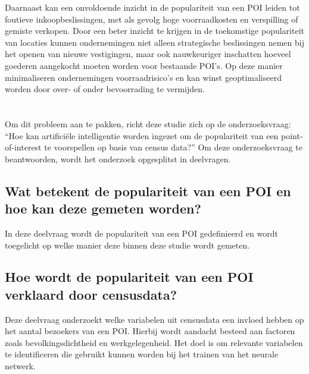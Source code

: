 Daarnaast kan een onvoldoende inzicht in de populariteit van een POI leiden tot foutieve inkoopbeslissingen, met als gevolg hoge voorraadkosten en verspilling of gemiste verkopen. Door een beter inzicht te krijgen in de toekomstige populariteit van locaties kunnen ondernemingen niet alleen strategische beslissingen nemen bij het openen van nieuwe vestigingen, maar ook nauwkeuriger inschatten hoeveel goederen aangekocht moeten worden voor bestaande POI’s. Op deze manier minimaliseren ondernemingen voorraadrisico’s en kan winst geoptimaliseerd worden door over- of onder bevoorrading te vermijden.


\section{}%
\label{sec:onderzoeksvraag}


Om dit probleem aan te pakken, richt deze studie zich op de onderzoeksvraag: “Hoe kan artificiële intelligentie worden ingezet om de populariteit van een point-of-interest te voorspellen op basis van census data?” Om deze onderzoeksvraag te beantwoorden, wordt het onderzoek opgesplitst in deelvragen.

\subsection{Wat betekent de populariteit van een POI en hoe kan deze gemeten worden?}
In deze deelvraag wordt de populariteit van een POI gedefinieerd en wordt toegelicht op welke manier deze binnen deze studie wordt gemeten.

\subsection{Hoe wordt de populariteit van een POI verklaard door censusdata?}
Deze deelvraag onderzoekt welke variabelen uit censusdata een invloed hebben op het aantal bezoekers van een POI. Hierbij wordt aandacht besteed aan factoren zoals bevolkingsdichtheid en werkgelegenheid. Het doel is om relevante variabelen te identificeren die gebruikt kunnen worden bij het trainen van het neurale netwerk.

